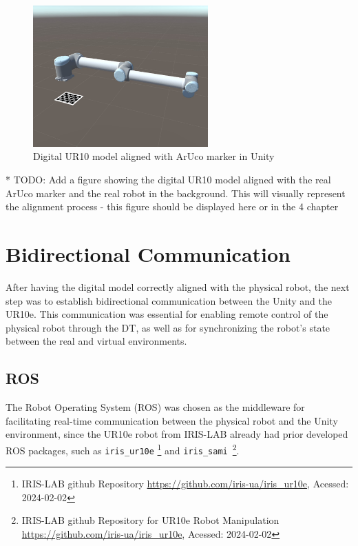 \begin{figure}[h]
    \centering
    \includegraphics[width=0.6\textwidth]{figs/robot_marker_unity.jpg}
    \caption{Digital UR10 model aligned with ArUco marker in Unity}
    \label{f:ur10_marker_unity}
\end{figure}

* TODO: Add a figure showing the digital UR10 model aligned with the real ArUco marker and the real robot in the background. This will visually represent the alignment process - this figure should be displayed here or in the 4 chapter

\section{Bidirectional Communication}

After having the digital model correctly aligned with the physical robot, the next step was to establish bidirectional communication between the Unity and the UR10e. This communication was essential for enabling remote control of the physical robot through the \ac{DT}, as well as for synchronizing the robot's state between the real and virtual environments.

\subsection{ROS}

The Robot Operating System (\ac{ROS}) was chosen as the middleware for facilitating real-time communication between the physical robot and the Unity environment, since the UR10e robot from IRIS-LAB already had prior developed \ac{ROS} packages, such as \texttt{iris\_ur10e} \footnote{IRIS-LAB github Repository \url{https://github.com/iris-ua/iris_ur10e}, Acessed: 2024-02-02} and \texttt{iris\_sami}~\footnote{IRIS-LAB github Repository for UR10e Robot Manipulation \url{https://github.com/iris-ua/iris_ur10e}, Acessed: 2024-02-02}.

